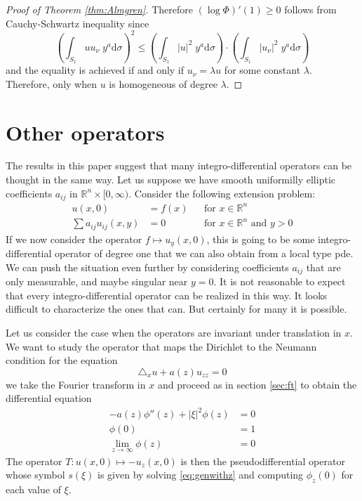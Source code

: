 \documentclass[letterpaper]{article}
\numberwithin{equation}{section}
\newcommand{\abs}[1]{\left\vert#1\right\vert}
\newcommand{\R}{\mathbb R}
\newcommand{\lap} {\triangle}
\newcommand{\ydd} {\; y^a \mathrm{d}}
\begin{document}
\begin{proof}[Proof of Theorem \ref{thm:Almgren}]
Therefore $(\log \Phi)' (1) \geq 0$ follows from Cauchy-Schwartz inequality since 
\[ \left( \int_{S_1}  u u_\nu \ydd \sigma \right)^2 \leq 
\left( \int_{S_1}  \abs{u}^2 \ydd \sigma \right) \cdot \left( \int_{S_1 } \abs{ u_\nu}^2 \ydd \sigma \right) \]
and the equality is achieved if and only if $u_\nu = \lambda u$ for some constant $\lambda$. Therefore, only when $u$ is homogeneous of degree $\lambda$.
\end{proof}

\section{Other operators}
The results in this paper suggest that many integro-differential operators can be thought in the same way. Let us suppose we have smooth uniformilly elliptic coefficients $a_{ij}$ in $\R^n \times [0,\infty)$. Consider the following extension problem:
\begin{align}
u(x,0) &= f(x) && \text{for } x \in \R^n \\
\sum a_{ij} u_{ij} (x,y) &= 0 && \text{for } x \in \R^n \text{ and } y > 0
\end{align}
If we now consider the operator $f \mapsto u_y(x,0)$, this is going to be some integro-differential operator of degree one that we can also obtain from a local type pde. We can push the situation even further by considering coefficients $a_{ij}$ that are only measurable, and maybe singular near $y=0$. It is not reasonable to expect that every integro-differential operator can be realized in this way. It looks difficult to characterize the ones that can. But certainly for many it is possible.

Let us consider the case when the operators are invariant under translation in $x$. We want to study the operator that maps the Dirichlet to the Neumann condition for the equation
\[ \lap_x u + a(z) u_{zz} = 0 \]
we take the Fourier transform in $x$ and proceed as in section \ref{sec:ft} to obtain the differential equation
\begin{equation} \label{eq:genwithz}
\begin{aligned}
 -a(z) \phi''(z) + \abs{\xi}^2 \phi(z) &= 0 \\
 \phi(0) &= 1 \\
 \lim_{z \to \infty} \phi(z) &=0
\end{aligned}
\end{equation}
The operator $T : u(x,0) \mapsto -u_z(x,0)$ is then the pseudodifferential operator whose symbol $s(\xi)$ is given by solving \eqref{eq:genwithz} and computing $\phi_z(0)$ for each value of $\xi$.
\end{document}
